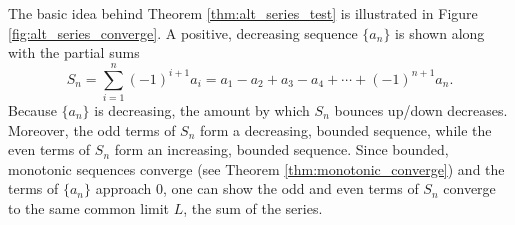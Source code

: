 The basic idea behind Theorem \ref{thm:alt_series_test} is illustrated in Figure \ref{fig:alt_series_converge}. A positive, decreasing sequence $\{a_n\}$ is shown along with the partial sums
$$S_n = \sum_{i=1}^n(-1)^{i+1}a_i =a_1-a_2+a_3-a_4+\cdots+(-1)^{n+1}a_n.$$ 
Because $\{a_n\}$ is decreasing, the amount by which $S_n$ bounces up/down decreases. Moreover, the odd terms of $S_n$ form a decreasing, bounded sequence, while the even terms of $S_n$ form an increasing, bounded sequence. Since bounded, monotonic sequences converge (see Theorem \ref{thm:monotonic_converge}) and the terms of $\{a_n\}$ approach 0, one can show the odd and even terms of $S_n$ converge to the same common limit $L$, the sum of the series.\\

